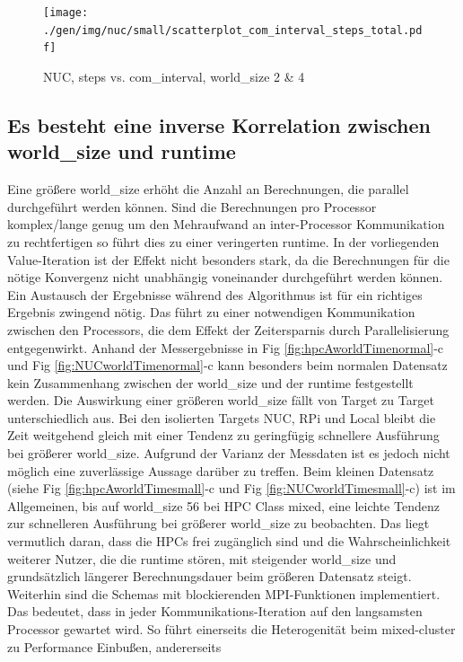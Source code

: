 \begin{figure}[h]
\texttt{[image: ./gen/img/nuc/small/scatterplot\_com\_interval\_steps\_total.pdf]}
\vspace*{-8mm}
\caption{NUC, steps vs. com\_interval, world\_size 2 \& 4}
\label{fig:ScatStepCom}
\end{figure}

\subsection{Es besteht eine inverse Korrelation zwischen world\_size und runtime}

Eine größere world\_size erhöht die Anzahl an Berechnungen, die parallel durchgeführt werden können.
Sind die Berechnungen pro Processor komplex/lange genug um den Mehraufwand an inter-Processor Kommunikation zu
rechtfertigen so führt dies zu einer veringerten runtime.
In der vorliegenden Value-Iteration ist der Effekt nicht besonders stark, da die Berechnungen für die nötige
Konvergenz nicht unabhängig voneinander durchgeführt werden können. Ein Austausch der Ergebnisse während des Algorithmus ist für ein
richtiges Ergebnis zwingend nötig. Das führt zu einer notwendigen Kommunikation zwischen den Processors,
die dem Effekt der Zeitersparnis durch Parallelisierung entgegenwirkt.
Anhand der Messergebnisse in Fig \ref{fig:hpcAworldTimenormal}-c und Fig \ref{fig:NUCworldTimenormal}-c kann besonders beim normalen Datensatz
kein Zusammenhang zwischen der world\_size und der runtime festgestellt werden.
Die Auswirkung einer größeren world\_size fällt von Target zu Target unterschiedlich aus.
Bei den isolierten Targets NUC, RPi und Local bleibt die Zeit weitgehend gleich mit einer Tendenz zu geringfügig schnellere Ausführung
bei größerer world\_size. Aufgrund der Varianz der Messdaten ist es jedoch nicht möglich eine zuverlässige Aussage darüber zu treffen.
Beim kleinen Datensatz (siehe Fig \ref{fig:hpcAworldTimesmall}-c und Fig \ref{fig:NUCworldTimesmall}-c) ist im Allgemeinen,
bis auf world\_size 56 bei HPC Class mixed, eine leichte Tendenz zur schnelleren Ausführung bei größerer world\_size zu beobachten.
Das liegt vermutlich daran, dass die HPCs frei zugänglich sind und die Wahrscheinlichkeit weiterer Nutzer, die die runtime
stören, mit steigender world\_size und grundsätzlich längerer Berechnungsdauer beim größeren Datensatz steigt.
Weiterhin sind die Schemas mit blockierenden MPI-Funktionen implementiert. Das bedeutet, dass in jeder Kommunikations-Iteration
auf den langsamsten Processor gewartet wird. So führt einerseits die Heterogenität beim mixed-cluster zu Performance Einbußen, andererseits
